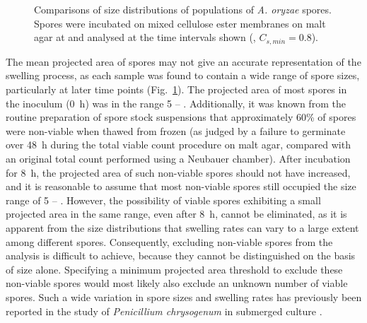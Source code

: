 \begin{figure}[htbp]
	\centering
	\hspace{1cm}
	\\
	\hspace{1cm}
	\\
  \caption{Comparisons of size distributions of populations of \emph{A. oryzae} spores. Spores were incubated on mixed cellulose ester membranes on malt agar at  and analysed at the time intervals shown (, $C_{s,min} = 0.8$).}
  \label{fig:SporeDistT}
\end{figure}

The mean projected area of spores may not give an accurate representation of the swelling process, as each sample was found to contain a wide range of spore sizes, particularly at later time points (Fig.~\ref{fig:SporeDistT}). The projected area of most spores in the inoculum (0~h) was in the range 5 -- . Additionally, it was known from the routine preparation of spore stock suspensions that approximately 60\% of spores were non-viable when thawed from frozen (as judged by a failure to germinate over 48~h during the total viable count procedure on malt agar, compared with an original total count performed using a Neubauer chamber). After incubation for 8~h, the projected area of such non-viable spores should not have increased, and it is reasonable to assume that most non-viable spores still occupied the size range of 5 -- . However, the possibility of viable spores exhibiting a small projected area in the same range, even after 8~h, cannot be eliminated, as it is apparent from the size distributions that swelling rates can vary to a large extent among different spores. Consequently, excluding non-viable spores from the analysis is difficult to achieve, because they cannot be distinguished on the basis of size alone. Specifying a minimum projected area threshold to exclude these non-viable spores would most likely also exclude an unknown number of viable spores. Such a wide variation in spore sizes and swelling rates has previously been reported in the study of \emph{Penicillium chrysogenum} in submerged culture \cite{paul1993}.

